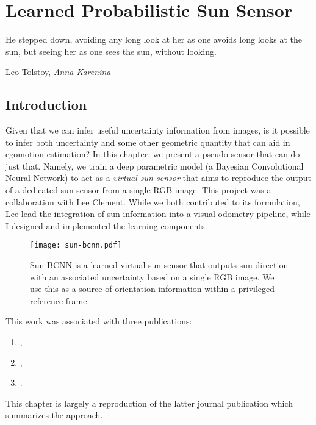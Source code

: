 \chapter{Learned Probabilistic Sun Sensor}
\epigraph{He stepped down, avoiding any long look at her as one avoids long looks at the sun, but seeing her as one sees the sun, without looking.}{Leo Tolstoy, \textit{Anna Karenina}}
\label{ch:sun-bcnn}

\section{Introduction}

Given that we can infer useful uncertainty information from images, is it possible to infer both uncertainty and some other geometric quantity that can aid in egomotion estimation? In this chapter, we present a pseudo-sensor that can do just that. Namely, we train a deep parametric model (a Bayesian Convolutional Neural Network) to act as a \textit{virtual sun sensor} that aims to reproduce the output of a dedicated sun sensor from a single RGB image.  This project was a collaboration with Lee Clement. While we both contributed to its formulation, Lee lead the integration of sun information into a visual odometry pipeline, while I designed and implemented the learning components.

\begin{figure*}[h!]
\centering
\texttt{[image: sun-bcnn.pdf]}
 \caption{Sun-BCNN is a learned virtual sun sensor that outputs sun direction with an associated uncertainty based on a single RGB image. We use this as a source of orientation information within a privileged reference frame.}
 \label{fig:sun-bcnn_intro_fig}
\end{figure*}

This work was associated with three publications:
\begin{enumerate}
\item {},
\item {},
\item {}.
\end{enumerate}
This chapter is largely a reproduction of the latter journal publication which summarizes the approach.
 

